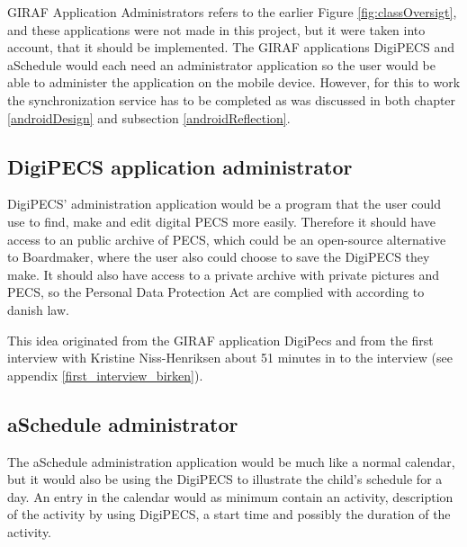 
 

GIRAF Application Administrators refers to the earlier Figure \vref{fig:classOversigt}, and these applications were not made in this project, but it were taken into account, that it should be implemented. The GIRAF applications DigiPECS and aSchedule would each need an administrator application so the user would be able to administer the application on the mobile device. However, for this to work the synchronization service has to be completed as was discussed in both chapter \vref{androidDesign} and subsection \ref{androidReflection}.
   
\subsection{DigiPECS application administrator}
DigiPECS' administration application would be a program that the user could use to find, make and edit digital PECS more easily. Therefore it should have access to an public archive of PECS, which could be an open-source alternative to Boardmaker, where the user also could choose to save the DigiPECS they make. It should also have access to a private archive with private pictures and PECS, so the Personal Data Protection Act are complied with according to danish law. 

This idea originated from the GIRAF application DigiPecs and from the first interview with Kristine Niss-Henriksen about 51 minutes in to the interview (see appendix \vref{first_interview_birken}).


\subsection{aSchedule administrator}
The aSchedule administration application would be much like a normal calendar, but it would also be using the DigiPECS to illustrate the child's schedule for a day. An entry in the calendar would as minimum contain an activity, description of the activity by using DigiPECS, a start time and possibly the duration of the activity. 


